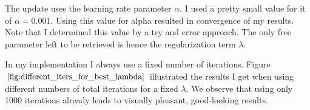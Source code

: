 \documentclass{paper}
\begin{document}
The update uses the learning rate parameter $\alpha$. I used a pretty small value for it of $\alpha=0.001$. Using this value for alpha resulted in convergence of my results. Note that I determined this value by a try and error approach. The only free parameter left to be retrieved is hence the regularization term $\lambda$.

In my implementation I always use a fixed number of iterations. Figure $\ref{fig:different_iters_for_best_lambda}$ illustrated the results I get when using different numbers of total iterations for a fixed $\lambda$. We observe that using only 1000 iterations already leads to visually pleasant, good-looking results.

\begin{figure}[h!]
\begin{center}
\end{center}
\end{figure}
\end{document}

